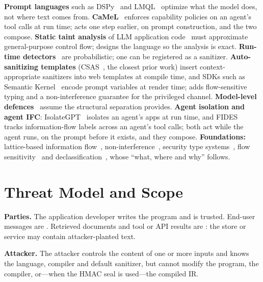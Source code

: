 \documentclass[conference]{IEEEtran}
\begin{document}
\textbf{Prompt languages} such as DSPy~\cite{khattab2024dspy} and LMQL~\cite{beurer2023lmql} optimize what the model does, not where text comes from. \textbf{CaMeL}~\cite{debenedetti2025camel} enforces capability policies on an agent's tool calls at run time; \TL{} acts one step earlier, on prompt construction, and the two compose. \textbf{Static taint analysis} of LLM application code~\cite{he2026taintp2x} must approximate general-purpose control flow; \TL{} designs the language so the analysis is exact. \textbf{Run-time detectors}~\cite{jacob2024promptshield,rebedea2023nemo} are probabilistic; one can be registered as a \TL{} sanitizer. \textbf{Auto-sanitizing templates} (CSAS~\cite{samuel2011csas}, the closest prior work) insert context-appropriate sanitizers into web templates at compile time, and SDKs such as Semantic Kernel~\cite{microsoft2024sk} encode prompt variables at render time; \TL{} adds flow-sensitive typing and a non-interference guarantee for the privileged channel. \textbf{Model-level defences}~\cite{wallace2024hierarchy,chen2025struq,chen2024secalign,piet2024jatmo,hines2024spotlighting} assume the structural separation \TL{} provides. \textbf{Agent isolation and agent IFC}: IsolateGPT~\cite{wu2025isolategpt} isolates an agent's apps at run time, and FIDES~\cite{costa2025fides} tracks information-flow labels across an agent's tool calls; both act while the agent runs, \TL{} on the prompt before it exists, and they compose. \textbf{Foundations:} lattice-based information flow~\cite{denning1976lattice}, non-interference~\cite{goguen1982security}, security type systems~\cite{volpano1996sound,sabelfeld2003language}, flow sensitivity~\cite{hunt2006flow} and declassification~\cite{sabelfeld2009declassification}, whose ``what, where and why''  follows.

\section{Threat Model and Scope}

\textbf{Parties.} The application developer writes the \TL{} program and is trusted. End-user messages are . Retrieved documents and tool or API results are : the store or service may contain attacker-planted text.

\textbf{Attacker.} The attacker controls the content of one or more inputs and knows the language, compiler and default sanitizer, but cannot modify the program, the compiler, or---when the HMAC seal is used---the compiled IR.
\end{document}
